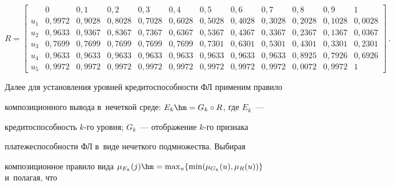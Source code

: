 {\footnotesize

  $$

  R=\left[

\begin{array}{c|ccccccccccc}

   & 0& 0{,}1& 0{,}2& 0{,}3& 0{,}4& 0{,}5&0{,}6& 0{,}7& 0{,}8 & 0{,}9 &1\\

   \hline

  u_1 &0{,}9972& 0{,}9028 & 0{,}8028& 0{,}7028& 0{,}6028& 0{,}5028& 

0{,}4028& 0{,}3028& 0{,}2028& 0{,}1028&0{,}0028\\

  u_2 & 0{,}9633& 0{,}9367& 0{,}8367& 0{,}7367& 0{,}6367& 0{,}5367& 

0{,}4367& 0{,}3367& 0{,}2367& 0{,}1367& 0{,}0367\\

  u_3 & 0{,}7699& 0{,}7699& 0{,}7699& 0{,}7699& 0{,}7699& 0{,}7301& 

0{,}6301& 0{,}5301& 0{,}4301& 0{,}3301& 0{,}2301\\

  u_4 & 0{,}9633& 0{,}9633& 0{,}9633& 0{,}9633& 0{,}9633& 0{,}9633& 

0{,}9633& 0{,}9633& 0{,}8925& 0{,}7926& 0{,}6926\\

  u_5 & 0{,}9972& 0{,}9972& 0{,}9972& 0{,}9972& 

0{,}9972&0{,}9972&0{,}9972& 0{,}9972& 0{,}0072& 0{,}9972&1

  \end{array}

  \right]\,.

  $$

  }

 

  Далее для установления уровней кредитоспособности ФЛ применим правило 

композиционного вывода в~нечеткой среде: $E_k\hm=G_k\circ R$, где $E_k$~--- 

кредитоспособность $k$-го уровня; $G_k$~--- отображение $k$-го признака 

платежеспособности ФЛ в~виде нечеткого подмножества. Выбирая 

композиционное правило вида $\mu_{E_k}(j)\hm= \max\nolimits_u \{ \min 

(\mu_{G_k}(u),\mu_R(u))\}$ и~полагая, что 

$$

